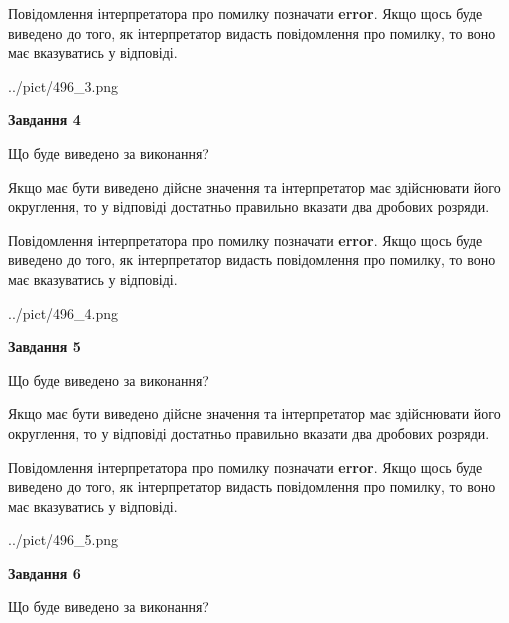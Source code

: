 \documentclass[12pt, ukrainian]{article}
\begin{document}
{\begin {Large}
Повідомлення інтерпретатора про помилку позначати \textbf{error}.
Якщо щось буде виведено до того, як інтерпретатор видасть повідомлення про помилку, 
то воно має вказуватись у відповіді. \par

\begin{center}
	{../pict/496_3.png}
\end{center}
\newpage

{\begin {center}\textbf{Завдання 4}\end {center}}\par
Що буде виведено за виконання? \par

Якщо має бути виведено дійсне значення та інтерпретатор має здійснювати його округлення, 
то у відповіді достатньо правильно вказати два дробових розряди.

Повідомлення інтерпретатора про помилку позначати \textbf{error}.
Якщо щось буде виведено до того, як інтерпретатор видасть повідомлення про помилку, 
то воно має вказуватись у відповіді. \par

\begin{center}
	{../pict/496_4.png}
\end{center}
\newpage

{\begin {center}\textbf{Завдання 5}\end {center}}\par
Що буде виведено за виконання? \par

Якщо має бути виведено дійсне значення та інтерпретатор має здійснювати його округлення, 
то у відповіді достатньо правильно вказати два дробових розряди.

Повідомлення інтерпретатора про помилку позначати \textbf{error}.
Якщо щось буде виведено до того, як інтерпретатор видасть повідомлення про помилку, 
то воно має вказуватись у відповіді. \par

\begin{center}
	{../pict/496_5.png}
\end{center}
\newpage

{\begin {center}\textbf{Завдання 6}\end {center}}\par
Що буде виведено за виконання? \par


\end{Large}}
\end{document}
